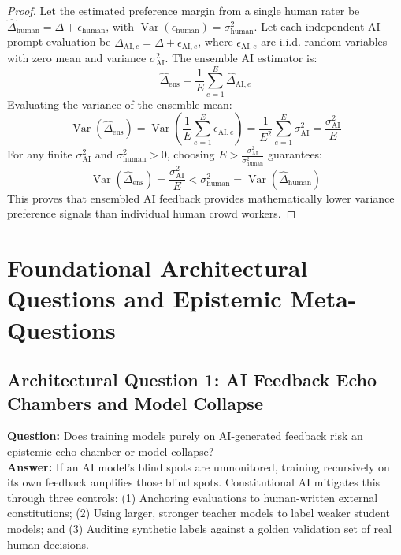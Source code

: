 \documentclass[11pt,a4paper]{article}
\theoremstyle{definition}
\begin{document}
\begin{proof}
Let the estimated preference margin from a single human rater be $\hat{\Delta}_{\text{human}} = \Delta + \epsilon_{\text{human}}$, with $\operatorname{Var}(\epsilon_{\text{human}}) = \sigma_{\text{human}}^2$.
Let each independent AI prompt evaluation be $\hat{\Delta}_{\text{AI}, e} = \Delta + \epsilon_{\text{AI}, e}$, where $\epsilon_{\text{AI}, e}$ are i.i.d. random variables with zero mean and variance $\sigma_{\text{AI}}^2$.
The ensemble AI estimator is:
{\boldmath
\begin{equation}
\hat{\Delta}_{\text{ens}} = \frac{1}{E}\sum_{e=1}^E \hat{\Delta}_{\text{AI}, e}
\end{equation}
}
Evaluating the variance of the ensemble mean:
{\boldmath
\begin{equation}
\operatorname{Var}(\hat{\Delta}_{\text{ens}}) = \operatorname{Var}\left( \frac{1}{E}\sum_{e=1}^E \epsilon_{\text{AI}, e} \right) = \frac{1}{E^2} \sum_{e=1}^E \sigma_{\text{AI}}^2 = \frac{\sigma_{\text{AI}}^2}{E}
\end{equation}
}
For any finite $\sigma_{\text{AI}}^2$ and $\sigma_{\text{human}}^2 > 0$, choosing $E > \frac{\sigma_{\text{AI}}^2}{\sigma_{\text{human}}^2}$ guarantees:
{\boldmath
\begin{equation}
\operatorname{Var}(\hat{\Delta}_{\text{ens}}) = \frac{\sigma_{\text{AI}}^2}{E} < \sigma_{\text{human}}^2 = \operatorname{Var}(\hat{\Delta}_{\text{human}})
\end{equation}
}
This proves that ensembled AI feedback provides mathematically lower variance preference signals than individual human crowd workers.
\end{proof}

\section{Foundational Architectural Questions and Epistemic Meta-Questions}

\subsection{Architectural Question 1: AI Feedback Echo Chambers and Model Collapse}
\textbf{Question:} Does training models purely on AI-generated feedback risk an epistemic echo chamber or model collapse?\\
\textbf{Answer:} If an AI model's blind spots are unmonitored, training recursively on its own feedback amplifies those blind spots. Constitutional AI mitigates this through three controls: (1) Anchoring evaluations to human-written external constitutions; (2) Using larger, stronger teacher models to label weaker student models; and (3) Auditing synthetic labels against a golden validation set of real human decisions.
\end{document}
